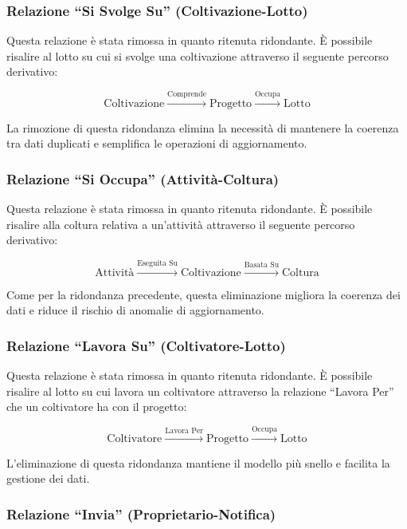 \documentclass[12pt,a4paper]{article}
\begin{document}
\subsubsection{Relazione ``Si Svolge Su'' (Coltivazione-Lotto)}

Questa relazione è stata rimossa in quanto ritenuta ridondante. È possibile risalire al lotto su cui si svolge una coltivazione attraverso il seguente percorso derivativo:

$$\text{Coltivazione} \xrightarrow{\text{Comprende}} \text{Progetto} \xrightarrow{\text{Occupa}} \text{Lotto}$$

La rimozione di questa ridondanza elimina la necessità di mantenere la coerenza tra dati duplicati e semplifica le operazioni di aggiornamento.

\subsubsection{Relazione ``Si Occupa'' (Attività-Coltura)}

Questa relazione è stata rimossa in quanto ritenuta ridondante. È possibile risalire alla coltura relativa a un'attività attraverso il seguente percorso derivativo:

$$\text{Attività} \xrightarrow{\text{Eseguita Su}} \text{Coltivazione} \xrightarrow{\text{Basata Su}} \text{Coltura}$$

Come per la ridondanza precedente, questa eliminazione migliora la coerenza dei dati e riduce il rischio di anomalie di aggiornamento.

\subsubsection{Relazione ``Lavora Su'' (Coltivatore-Lotto)}

Questa relazione è stata rimossa in quanto ritenuta ridondante. È possibile risalire al lotto su cui lavora un coltivatore attraverso la relazione ``Lavora Per'' che un coltivatore ha con il progetto:

$$\text{Coltivatore} \xrightarrow{\text{Lavora Per}} \text{Progetto} \xrightarrow{\text{Occupa}} \text{Lotto}$$

L'eliminazione di questa ridondanza mantiene il modello più snello e facilita la gestione dei dati.

\subsubsection{Relazione ``Invia'' (Proprietario-Notifica)}
\end{document}

